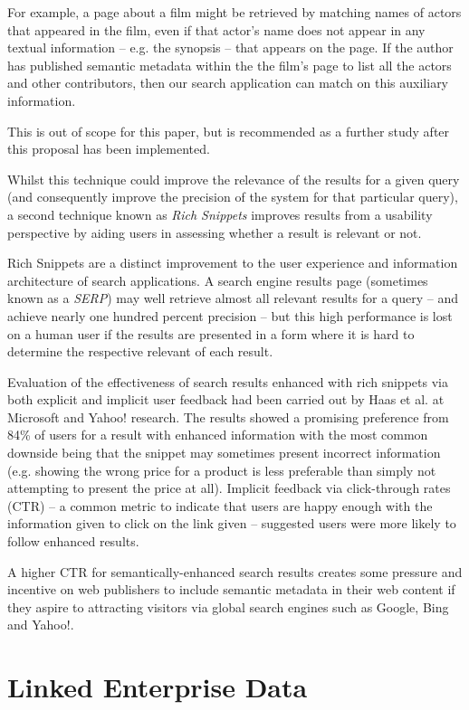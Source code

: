 For example, a page about a film might be retrieved
by matching names of actors that appeared in the film, even if that actor's
name does not appear in any textual information -- e.g. the synopsis --
that appears on the page. If the author has published semantic metadata
within the the film's page to list all the actors and other contributors,
then our search application can match on this auxiliary information.

This is out of scope for this paper, but
is recommended as a further study after this proposal has been implemented.

Whilst this technique could improve the relevance of the results for a
given query (and consequently improve the precision of the system for that
particular query), a second technique known as \emph{Rich Snippets} improves
results from a usability perspective by aiding users in assessing whether
a result is relevant or not.

Rich Snippets are a distinct improvement 
to the user experience and information architecture
of search applications. A search engine results page (sometimes known as a
\emph{SERP}) may well retrieve almost all relevant results for a query -- and
achieve nearly one hundred percent precision -- but this high performance
is lost on a human user if the results are presented in a form where it is
hard to determine the respective relevant of each result.

Evaluation of the effectiveness of search results enhanced with rich snippets
via both explicit and implicit user feedback had been carried out by
Haas et al.\cite{haas2011enhanced} at Microsoft and Yahoo! research. The
results showed a promising preference from 84\% of users for a result
with enhanced information with the most common downside being that the
snippet may sometimes present incorrect information (e.g. showing the wrong
price for a product is less preferable than simply not attempting to present
the price at all). Implicit feedback via click-through rates (CTR) --
a common metric to indicate that users are happy enough with the information
given to click on the link given -- suggested users were more likely to
follow enhanced results.

A higher CTR for semantically-enhanced search results creates some pressure
and incentive on web publishers to include semantic metadata in their web
content if they aspire to attracting visitors via global search engines such
as Google, Bing and Yahoo!.

\section{Linked Enterprise Data}
\label{linked-enterprise-data}


